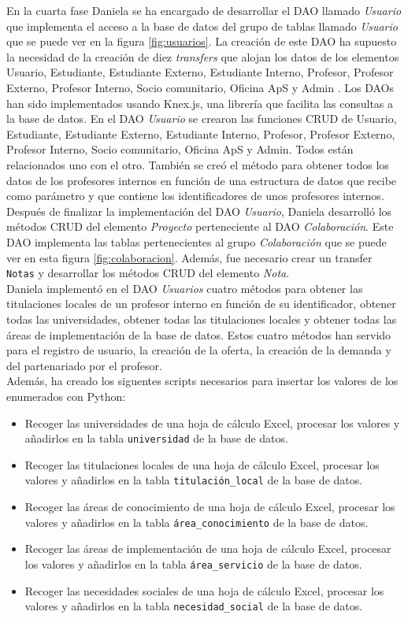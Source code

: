 \documentclass[11pt]{book}
\begin{document}
	En la cuarta fase Daniela se ha encargado de desarrollar el DAO llamado \textit{Usuario} que implementa el acceso a la base de datos del grupo de tablas llamado \textit{Usuario} que se puede ver en la figura \ref{fig:usuarios}. La creación de este DAO ha supuesto la necesidad de la creación de diez \textit{transfers} que alojan los datos de los elementos Usuario, Estudiante, Estudiante Externo, Estudiante Interno, Profesor, Profesor Externo, Profesor Interno, Socio comunitario, Oficina ApS y Admin . Los DAOs han sido implementados usando Knex.js, una librería que facilita las consultas a la base de datos. En el DAO \textit{Usuario} se crearon las funciones CRUD de Usuario, Estudiante, Estudiante Externo, Estudiante Interno, Profesor, Profesor Externo, Profesor Interno, Socio comunitario, Oficina ApS y Admin. Todos están relacionados uno con el otro. También se creó el método para obtener todos los datos de los profesores internos en función de una estructura de datos que recibe como parámetro y que contiene los identificadores de unos profesores internos.\\
	Después de finalizar la implementación del DAO \textit{Usuario}, Daniela desarrolló los métodos CRUD del elemento \textit{Proyecto} perteneciente al DAO \textit{Colaboración}. Este DAO implementa las tablas pertenecientes al grupo \textit{Colaboración} que se puede ver en esta figura \ref{fig:colaboracion}. Además, fue necesario crear un transfer \texttt{Notas} y desarrollar los métodos CRUD del elemento \textit{Nota}.\\
	Daniela implementó en el DAO \textit{Usuarios} cuatro métodos para obtener las titulaciones locales de un profesor interno en función de su identificador, obtener todas las universidades, obtener todas las titulaciones locales y obtener todas las áreas de implementación de la base de datos. Estos cuatro métodos han servido para el registro de usuario, la creación de la oferta, la creación de la demanda y del partenariado por el profesor.\\
	Además, ha creado los siguentes scripts necesarios para insertar los valores de los enumerados con Python:
	\begin{itemize} 
		\item Recoger las universidades de una hoja de cálculo Excel, procesar los valores y añadirlos en la tabla \texttt{universidad} de la base de datos.
		\item Recoger las titulaciones locales de una hoja de cálculo Excel, procesar los valores y añadirlos en la tabla \texttt{titulación\_local} de la base de datos.
		\item Recoger las áreas de conocimiento de una hoja de cálculo Excel, procesar los valores y añadirlos en la tabla \texttt{área\_conocimiento} de la base de datos.
		\item Recoger las áreas de implementación de una hoja de cálculo Excel, procesar los valores y añadirlos en la tabla \texttt{área\_servicio} de la base de datos.
		\item Recoger las necesidades sociales de una hoja de cálculo Excel, procesar los valores y añadirlos en la tabla \texttt{necesidad\_social} de la base de datos.\\
	\end{itemize}
\end{document}
